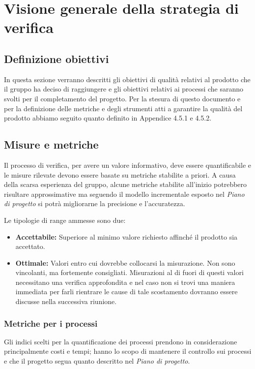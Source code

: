 \documentclass[a4paper]{article}
\begin{document}
	\section{Visione generale della strategia di verifica}
		
			\subsection{Definizione obiettivi}
			In questa sezione verranno descritti gli obiettivi di qualità relativi al prodotto che il 
			gruppo ha deciso di raggiungere e gli obiettivi relativi ai processi che saranno svolti per 
			il completamento del progetto.
			Per la stesura di questo documento e per la definizione delle metriche e degli strumenti atti a garantire la qualità del prodotto abbiamo seguito quanto definito in Appendice 4.5.1 e 4.5.2. 
	
\subsection{Misure e metriche}
			 Il processo di verifica, per avere un valore informativo, deve essere quantificabile e le misure rilevate
 devono essere basate su metriche stabilite a priori. 
 A causa della scarsa esperienza del gruppo, alcune metriche stabilite all'inizio potrebbero risultare approssimative ma
 seguendo il modello incrementale esposto nel \emph{Piano di progetto} si potrà migliorarne la precisione e l'accuratezza.

			Le tipologie di range ammesse sono due:
			\begin{itemize}
				\item \textbf{Accettabile:} Superiore al minimo valore richiesto affinché il prodotto sia accettato.
				\item \textbf{Ottimale:} Valori entro cui dovrebbe collocarsi la misurazione. Non sono vincolanti,
				ma fortemente consigliati. Misurazioni al di fuori di questi valori necessitano una verifica approfondita e nel
				caso non si trovi una maniera immediata per farli rientrare le cause di tale scostamento dovranno essere
				discusse nella successiva riunione.
			\end{itemize}
			\subsubsection{Metriche per i processi}
				Gli indici scelti per la quantificazione dei processi prendono in considerazione principalmente costi e tempi;
				hanno lo scopo di mantenere il controllo sui processi e che il progetto segua quanto descritto nel \emph{Piano di
				progetto}.
				
\end{document}
